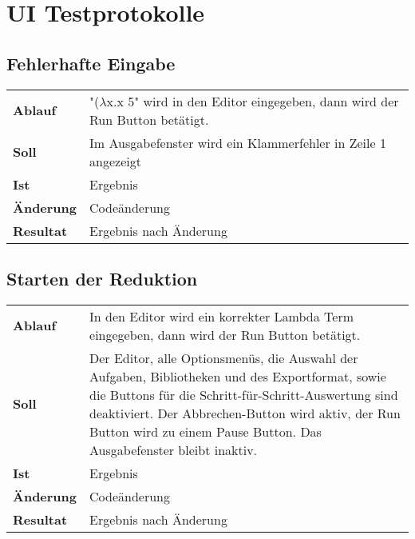 \documentclass{article}
\begin{document}
\section{UI Testprotokolle}

\subsection{Fehlerhafte Eingabe}

\begin{tabularx}{\textwidth}{>{\bfseries}lX}
Ablauf & "($\lambda$x.x 5" wird in den Editor eingegeben, dann wird der Run Button betätigt.\\
Soll & Im Ausgabefenster wird ein Klammerfehler in Zeile 1 angezeigt \\
Ist & Ergebnis \\
Änderung & Codeänderung\\
Resultat & Ergebnis nach Änderung \\
\end{tabularx}


\subsection{Starten der Reduktion}
\begin{tabularx}{\textwidth}{>{\bfseries}lX}
Ablauf & In den Editor wird ein korrekter Lambda Term eingegeben, dann wird der Run Button betätigt.\\
Soll & Der Editor, alle Optionsmenüs, die Auswahl der Aufgaben, Bibliotheken und des Exportformat, sowie die Buttons für die Schritt-für-Schritt-Auswertung sind deaktiviert. Der Abbrechen-Button wird aktiv, der Run Button wird zu einem Pause Button. Das Ausgabefenster bleibt inaktiv.\\
Ist & Ergebnis \\
Änderung & Codeänderung\\
Resultat & Ergebnis nach Änderung \\
\end{tabularx}
\end{document}
